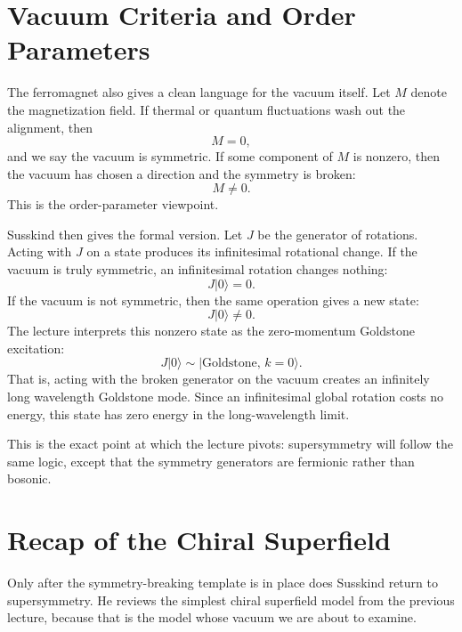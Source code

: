 \section{Vacuum Criteria and Order Parameters}

The ferromagnet also gives a clean language for the vacuum itself. Let \(M\) denote the magnetization field. If thermal or quantum fluctuations wash out the alignment, then
\begin{equation}
M=0,
\end{equation}
and we say the vacuum is symmetric. If some component of \(M\) is nonzero, then the vacuum has chosen a direction and the symmetry is broken:
\begin{equation}
M\neq 0.
\end{equation}
This is the order-parameter viewpoint.

Susskind then gives the formal version. Let \(J\) be the generator of rotations. Acting with \(J\) on a state produces its infinitesimal rotational change. If the vacuum is truly symmetric, an infinitesimal rotation changes nothing:
\begin{equation}
J|0\rangle=0.
\end{equation}
If the vacuum is not symmetric, then the same operation gives a new state:
\begin{equation}
J|0\rangle\neq 0.
\end{equation}
The lecture interprets this nonzero state as the zero-momentum Goldstone excitation:
\begin{equation}
J|0\rangle \sim |\text{Goldstone},\,k=0\rangle.
\end{equation}
That is, acting with the broken generator on the vacuum creates an infinitely long wavelength Goldstone mode. Since an infinitesimal global rotation costs no energy, this state has zero energy in the long-wavelength limit.

This is the exact point at which the lecture pivots: supersymmetry will follow the same logic, except that the symmetry generators are fermionic rather than bosonic.

\section{Recap of the Chiral Superfield}

Only after the symmetry-breaking template is in place does Susskind return to supersymmetry. He reviews the simplest chiral superfield model from the previous lecture, because that is the model whose vacuum we are about to examine.

